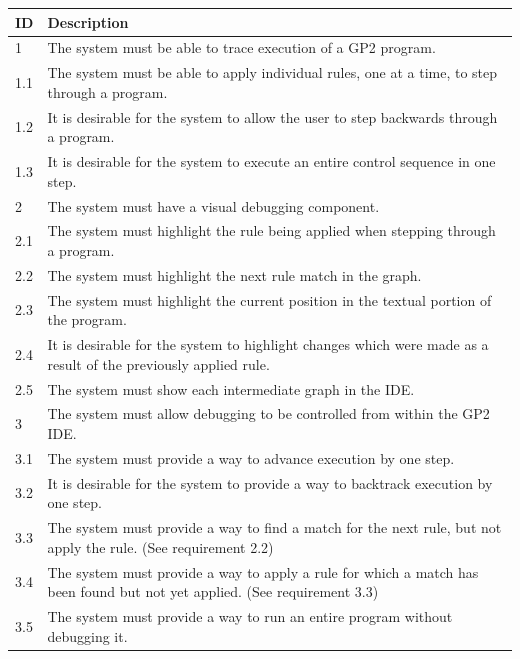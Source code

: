 \documentclass[authoryearcitations]{UoYCSproject}
\begin{document}
\begin{table}[tbp]
    \begin{tabularx}{\linewidth}{|l|X|}
        \hline
        \textbf{ID} & \textbf{Description} \\
        \hline
        1    &  The system must be able to trace execution of a GP2 program. \\ \hline
        1.1  &  The system must be able to apply individual rules, one at a time,
                to step through a program. \\ \hline
        1.2  &  It is desirable for the system to allow the user to step
                backwards through a program. \\ \hline
        1.3  &  It is desirable for the system to execute an entire control sequence
                in one step. \\ \hline

        2    &  The system must have a visual debugging component. \\ \hline
        2.1  &  The system must highlight the rule being applied when stepping
                through a program. \\ \hline
        2.2  &  The system must highlight the next rule match in the graph. \\ \hline
        2.3  &  The system must highlight the current position in the textual
                portion of the program. \\ \hline
        2.4  &  It is desirable for the system to highlight changes which were
                made as a result of the previously applied rule. \\ \hline
        2.5  &  The system must show each intermediate graph in the IDE. \\ \hline

        3    &  The system must allow debugging to be controlled from within the
                GP2 IDE. \\ \hline
        3.1  &  The system must provide a way to advance execution by one step. \\ \hline
        3.2  &  It is desirable for the system to provide a way to backtrack
                execution by one step. \\ \hline
        3.3  &  The system must provide a way to find a match for the next rule,
                but not apply the rule. (See requirement 2.2) \\ \hline
        3.4  &  The system must provide a way to apply a rule for which a match
                has been found but not yet applied. (See requirement 3.3) \\ \hline
        3.5  &  The system must provide a way to run an entire program without
                debugging it. \\ \hline


\end{tabularx}
\end{table}
\end{document}
